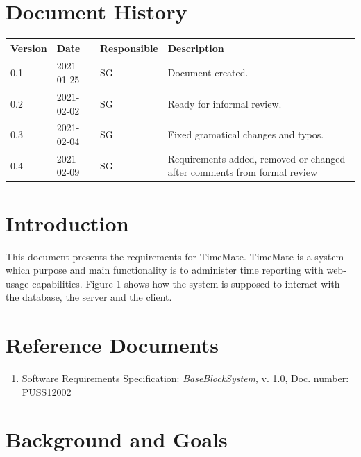 \documentclass{article}
\date {#1}
\title {
    \documentNumber {01}    
    
    \documentVersion {0.4}
    
    \documentTitle {Software Requirements Specification}
    \documentGroup {2}
    
    \documentResponsible {System Group}
    \documentAuthors {System Group, Development Group}
    
    \documentDate {2021-02-09}
}
\begin{document}
\maketitle
\thispagestyle{empty}

\newpage

\tableofcontents

\newpage

\section{Document History}
\begin{tabular}{ l | l | l | l }
    Version & Date & Responsible & Description \\
    \hline
    0.1 & 2021-01-25 & SG & Document created. \\
    0.2 & 2021-02-02 & SG & Ready for informal review. \\
    0.3 & 2021-02-04 & SG & Fixed gramatical changes and typos. \\
    0.4 & 2021-02-09 & SG & Requirements added, removed or changed after comments from formal review \\
\end{tabular}

\section{Introduction}

This document presents the requirements for TimeMate. TimeMate is a system which purpose and main functionality is to administer time reporting with web-usage capabilities. Figure 1 shows how the system is supposed to interact with the database, the server and the client.


\section{Reference Documents}

\begin{enumerate}
  \item Software Requirements Specification: \emph{BaseBlockSystem}, v. 1.0, Doc. number: PUSS12002
  
\end{enumerate}

\section{Background and Goals}
\end{document}

